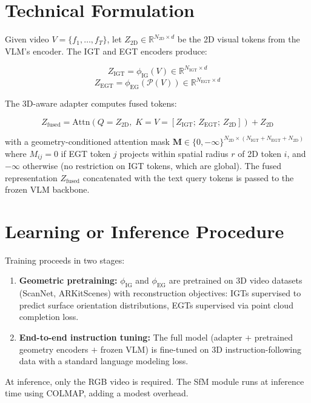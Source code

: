 \documentclass[10pt,twocolumn]{article}
\begin{document}
\section{Technical Formulation}

Given video $V = \{f_1, \ldots, f_T\}$, let $Z_\mathrm{2D} \in \mathbb{R}^{N_\mathrm{2D} \times d}$
be the 2D visual tokens from the VLM's encoder. The IGT and EGT
encoders produce:

\[
Z_\mathrm{IGT} = \phi_\mathrm{IG}(V) \in \mathbb{R}^{N_\mathrm{IGT} \times d}
\]
\[
Z_\mathrm{EGT} = \phi_\mathrm{EG}(\mathcal{P}(V)) \in \mathbb{R}^{N_\mathrm{EGT} \times d}
\]

The 3D-aware adapter computes fused tokens:

\[
Z_\mathrm{fused} = \mathrm{Attn}\!\left(Q = Z_\mathrm{2D},\;
  K = V = [Z_\mathrm{IGT};\, Z_\mathrm{EGT};\, Z_\mathrm{2D}]\right) + Z_\mathrm{2D}
\]

with a geometry-conditioned attention mask $\mathbf{M} \in \{0,-\infty\}^{N_\mathrm{2D} \times (N_\mathrm{IGT}+N_\mathrm{EGT}+N_\mathrm{2D})}$
where $M_{ij} = 0$ if EGT token $j$ projects within spatial radius $r$
of 2D token $i$, and $-\infty$ otherwise (no restriction on IGT
tokens, which are global). The fused representation $Z_\mathrm{fused}$
concatenated with the text query tokens is passed to the frozen VLM backbone.

\section{Learning or Inference Procedure}

Training proceeds in two stages:

\begin{enumerate}[itemsep=2pt,parsep=0pt]
  \item \textbf{Geometric pretraining:} $\phi_\mathrm{IG}$ and $\phi_\mathrm{EG}$
    are pretrained on 3D video datasets (ScanNet, ARKitScenes) with
    reconstruction objectives: IGTs supervised to predict surface
    orientation distributions, EGTs supervised via point cloud
    completion loss.
  \item \textbf{End-to-end instruction tuning:} The full model
    (adapter $+$ pretrained geometry encoders $+$ frozen VLM) is
    fine-tuned on 3D instruction-following data with a standard
    language modeling loss.
\end{enumerate}

At inference, only the RGB video is required. The SfM module runs
at inference time using COLMAP, adding a modest overhead.
\end{document}
